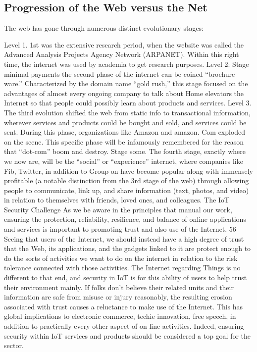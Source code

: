 \subsection{Progression of the Web versus the Net}

The web has gone through numerous distinct evolutionary stages:


Level 1. 1st was the extensive research period, when the website was called the Advanced Analysis Projects Agency Network (ARPANET). Within this right time, the internet was used by academia to get research purposes.
Level 2: Stage minimal payments the second phase of the internet can be coined “brochure ware.” Characterized by the domain name “gold rush,” this stage focused on the advantages of almost every ongoing company to talk about
 Home elevators the Internet so that people could possibly learn about products and services.
Level 3. The third evolution shifted the web from static info to transactional information, wherever services and products could be bought and sold, and services could be sent.
During this phase, organizations like Amazon and amazon. Com exploded on the scene. This specific phase will be infamously remembered for the reason that “dot-com” boom and destroy. Stage some. The fourth stage, exactly where we now are, will be the “social” or “experience” internet, where companies like Fib, Twitter, in addition to Group on have become popular along with immensely
profitable (a notable distinction from the 3rd stage of the web) through allowing people to communicate, link up, and share information (text, photos, and video) in relation to themselves with friends, loved ones, and colleagues.
The IoT Security Challenge As we be aware in the principles that manual our work, ensuring the protection, reliability, resilience, and balance of online applications and services is important to promoting trust and also use of the Internet. 56 Seeing that users of the Internet, we should instead have a high degree of trust that the Web, its applications, and the gadgets linked to it are protect enough to do the sorts of activities we want to do on the internet in relation to the risk tolerance connected with those activities. The Internet regarding Things is no different to that end, and security in IoT is for this ability of users to help trust their environment mainly. If folks don’t believe their related units and their information are safe from misuse or injury reasonably, the resulting erosion associated with trust causes a reluctance to make use of the Internet. This has global implications to electronic commerce, techie innovation, free speech, in addition to practically every other aspect of on-line activities. Indeed, ensuring security within IoT services and products should be considered a top goal for the sector.
